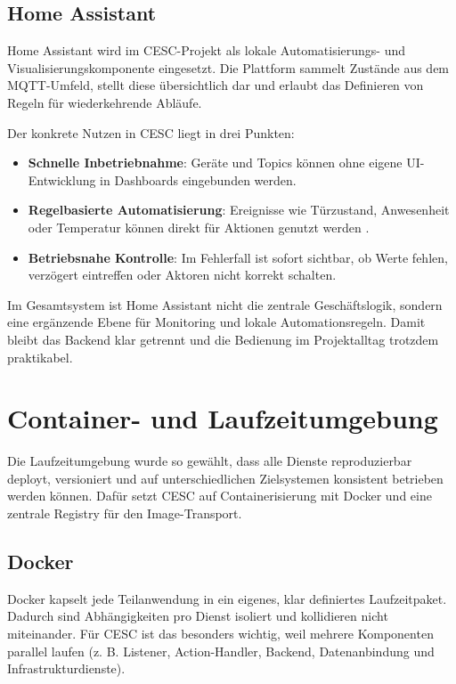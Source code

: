 \subsection{Home Assistant}

Home Assistant wird im CESC-Projekt als lokale Automatisierungs- und Visualisierungskomponente eingesetzt. Die Plattform sammelt Zustände aus dem MQTT-Umfeld, stellt diese übersichtlich dar und erlaubt das Definieren von Regeln für wiederkehrende Abläufe.

Der konkrete Nutzen in CESC liegt in drei Punkten:

\begin{itemize}
    \item \textbf{Schnelle Inbetriebnahme}: Geräte und Topics können ohne eigene UI-Entwicklung in Dashboards eingebunden werden.
    \item \textbf{Regelbasierte Automatisierung}: Ereignisse wie Türzustand, Anwesenheit oder Temperatur können direkt für Aktionen genutzt werden \cite{ha_automation_basics}.
    \item \textbf{Betriebsnahe Kontrolle}: Im Fehlerfall ist sofort sichtbar, ob Werte fehlen, verzögert eintreffen oder Aktoren nicht korrekt schalten.
\end{itemize}

Im Gesamtsystem ist Home Assistant nicht die zentrale Geschäftslogik, sondern eine ergänzende Ebene für Monitoring und lokale Automationsregeln. Damit bleibt das Backend klar getrennt und die Bedienung im Projektalltag trotzdem praktikabel.

\section{Container- und Laufzeitumgebung}

Die Laufzeitumgebung wurde so gewählt, dass alle Dienste reproduzierbar deployt, versioniert und auf unterschiedlichen Zielsystemen konsistent betrieben werden können. Dafür setzt CESC auf Containerisierung mit Docker und eine zentrale Registry für den Image-Transport.

\subsection{Docker}

Docker kapselt jede Teilanwendung in ein eigenes, klar definiertes Laufzeitpaket. Dadurch sind Abhängigkeiten pro Dienst isoliert und kollidieren nicht miteinander. Für CESC ist das besonders wichtig, weil mehrere Komponenten parallel laufen (z. B. Listener, Action-Handler, Backend, Datenanbindung und Infrastrukturdienste).

